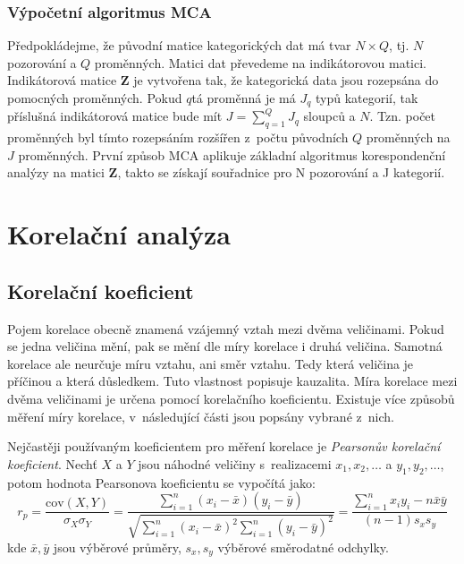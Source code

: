\subsubsection*{Výpočetní algoritmus MCA}

Předpokládejme, že původní matice kategorických dat má tvar $N\times Q$, tj. $N$ pozorování a $Q$ proměnných. Matici dat převedeme na indikátorovou matici. Indikátorová matice  $\mathbf{Z} $ je vytvořena tak, že kategorická data jsou rozepsána do pomocných proměnných. Pokud $q$tá proměnná je má $J_q$ typů kategorií, tak příslušná indikátorová matice bude mít $J = \sum_{q=1}^{Q}J_q$ sloupců a $N$. Tzn. počet proměnných byl tímto rozepsáním rozšířen z~počtu původních $Q$ proměnných na $J$ proměnných.
První způsob MCA aplikuje základní algoritmus korespondenční analýzy na matici  $\mathbf{Z}$, takto se získají souřadnice pro N pozorování a J kategorií.




\section{Korelační analýza}
\label{sec:Teoriekorelace}
\subsection{Korelační koeficient}

Pojem korelace obecně znamená vzájemný vztah mezi dvěma veličinami. Pokud se jedna veličina mění, pak se mění dle míry korelace i druhá veličina. Samotná korelace ale neurčuje míru vztahu, ani směr vztahu. Tedy která veličina je příčinou a která důsledkem. Tuto vlastnost popisuje kauzalita. Míra korelace mezi dvěma veličinami je určena pomocí korelačního koeficientu. Existuje více způsobů měření míry korelace, v~následující části jsou popsány vybrané z~nich.\cite{bib:MB}

Nejčastěji používaným koeficientem pro měření korelace je \emph{Pearsonův korelační koeficient}. Nechť $X$ a $Y$ jsou náhodné veličiny s~realizacemi $x_1, x_2, \ldots$ a $y_1, y_2, \ldots$, potom hodnota Pearsonova koeficientu se vypočítá jako:
\begin{equation}
    r_p = \frac{\mathrm{cov}(X,Y)}{\sigma_X\sigma_Y} = 
    \frac{ \sum_{i=1}^{n}(x_i-\bar{x})(y_i-\bar{y}) }
    {
        \sqrt{
            \sum_{i=1}^{n}(x_i-\bar{x})^2
            \sum_{i=1}^{n}(y_i-\bar{y})^2
            }
    } 
    = \frac{ \sum_{i=1}^{n}x_i y_i - n\bar{x}\bar{y} }
    {
          (n-1) s_{x} s_{y}
    }
\end{equation}
kde $\bar{x}, \bar{y}$ jsou výběrové průměry, $s_x, s_y$ výběrové směrodatné odchylky.\cite{bib:MB}

